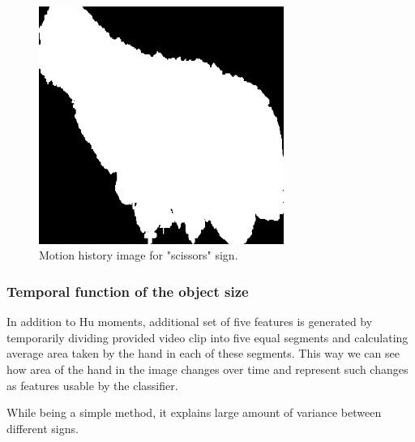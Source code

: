\begin{figure}
\begin{center}
\includegraphics[width=80mm]{mhi_scissors.png}
\caption{Motion history image for "scissors" sign.}
\label{fig:mhis}
\end{center}
\end{figure}

\subsubsection*{Temporal function of the object size}

In addition to Hu moments, additional set of five features is generated by temporarily dividing provided video clip into five equal segments and calculating average area taken by the hand in each of these segments. This way we can see how area of the hand in the image changes over time and represent such changes as features usable by the classifier. 

While being a simple method, it explains large amount of variance between different signs. 